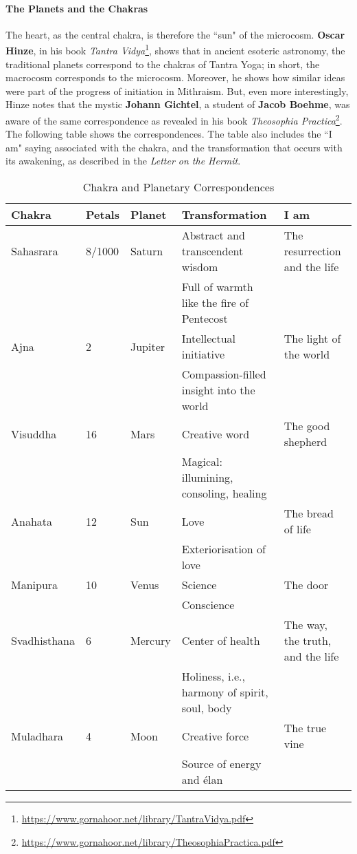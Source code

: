 \paragraph{The Planets and the Chakras}
The heart, as the central chakra, is therefore the ``sun" of the microcosm. \textbf{Oscar Hinze}, in his book \textit{Tantra Vidya}\footnote{\url{https://www.gornahoor.net/library/TantraVidya.pdf}}, shows that in ancient esoteric astronomy, the traditional planets correspond to the chakras of Tantra Yoga; in short, the macrocosm corresponds to the microcosm. Moreover, he shows how similar ideas were part of the progress of initiation in Mithraism. But, even more interestingly, Hinze notes that the mystic \textbf{Johann Gichtel}, a student of \textbf{Jacob Boehme}, was aware of the same correspondence as revealed in his book \textit{Theosophia Practica}\footnote{\url{https://www.gornahoor.net/library/TheosophiaPractica.pdf}}. The following table shows the correspondences. The table also includes the ``I am" saying associated with the chakra, and the transformation that occurs with its awakening, as described in the \emph{Letter on the Hermit}.

\begin{table}[h]\small
\begin{tabularx}{\textwidth}{lllXX}\toprule
\textbf{Chakra} &
\textbf{Petals} &
\textbf{Planet} &
\textbf{Transformation} &
\textbf{I am}\\\toprule
Sahasrara &
8/1000 &
Saturn &
Abstract and transcendent wisdom &
The resurrection and the life\\
&&&Full of warmth like the fire of Pentecost&\\\midrule
Ajna &
2 &
Jupiter &
Intellectual initiative &
The light of the world\\
&&& Compassion-filled insight into the world&\\\midrule
Visuddha &
16 &
Mars &
Creative word &
The good shepherd\\
&&& Magical: illumining, consoling, healing&\\\midrule
Anahata &
12 &
Sun &
Love &
The bread of life\\
&&&Exteriorisation of love&\\\midrule
Manipura &
10 &
Venus &
Science &
The door\\
&&&Conscience&\\\midrule
Svadhisthana &
6 &
Mercury &
Center of health&
The way, the truth, and the life\\
&&& Holiness, i.e., harmony of spirit, soul, body&\\\midrule
Muladhara &
4 &
Moon &
Creative force &
The true vine\\
&&& Source of energy and élan&\\\bottomrule
\end{tabularx}
\caption{Chakra and Planetary Correspondences}
\end{table} 

